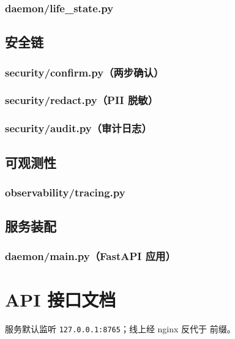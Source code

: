 \subsection{daemon/life\_state.py}


\section{安全链}
\subsection{security/confirm.py（两步确认）}

\subsection{security/redact.py（PII 脱敏）}

\subsection{security/audit.py（审计日志）}


\section{可观测性}
\subsection{observability/tracing.py}


\section{服务装配}
\subsection{daemon/main.py（FastAPI 应用）}



\chapter{API 接口文档}
\noindent 服务默认监听 \texttt{127.0.0.1:8765}；线上经 nginx 反代于  前缀。

